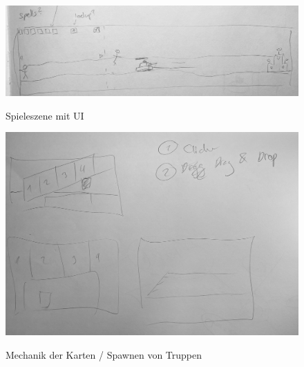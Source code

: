     \begin{figure}[H]
        \centering
        \includegraphics[width=14.5cm]{resources/sk_gamemain.jpeg}\\
        \caption{Spieleszene mit UI}
    \end{figure}

    \begin{figure}[H]
        \includegraphics[width=14.5cm]{resources/Sk_dragndrop.jpeg}\\
        \caption{Mechanik der Karten / Spawnen von Truppen}
    \end{figure}

